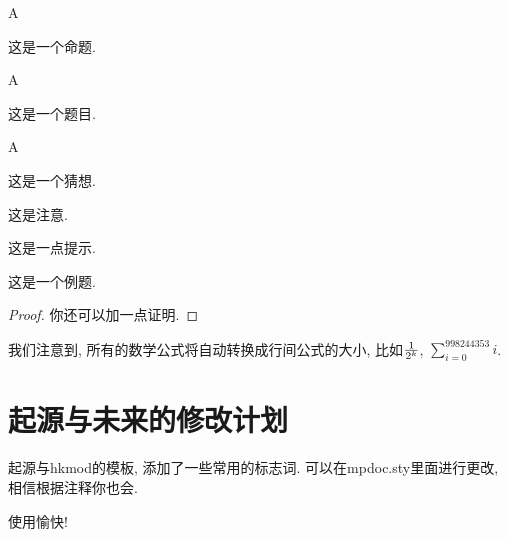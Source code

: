 \documentclass[a4,10pt]{ctexart}
\begin{document}
\begin{mt}{A}{}
        
这是一个命题.
    
\end{mt}

\begin{ti}{A}{}
        
这是一个题目.
    
\end{ti}

\begin{cx}{A}{}
        
这是一个猜想.
    
\end{cx}

\begin{zy}
        
这是注意.
    
\end{zy}

\begin{ts}
        
这是一点提示.
    
\end{ts}

\begin{lt}
        
这是一个例题.
    
\end{lt}

\begin{proof}
你还可以加一点证明. 
\end{proof}

我们注意到, 所有的数学公式将自动转换成行间公式的大小, 比如${1\over 2^k}$, $\sum_{i=0}^{998244353}i$. 

\section{起源与未来的修改计划}

起源与hkmod的模板, 添加了一些常用的标志词. 可以在mpdoc.sty里面进行更改, 相信根据注释你也会. 

使用愉快! 
\end{document}
